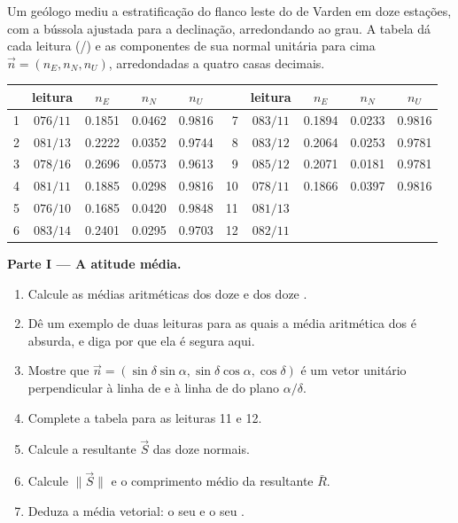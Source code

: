 \begin{problem}
\label{pb:b1:field-lab-methods-1:1}
Um geólogo mediu a estratificação do flanco leste do  de Varden em doze estações, com a bússola ajustada para a declinação, arredondando ao grau. A tabela dá cada leitura (/) e as componentes de sua normal unitária para cima $\vec n = (n_E, n_N, n_U)$, arredondadas a quatro casas decimais.
\begin{center}
\small
\begin{tabular}{rcccc@{\qquad}rcccc}
\hline
 & leitura & $n_E$ & $n_N$ & $n_U$ & & leitura & $n_E$ & $n_N$ & $n_U$ \\
\hline
1 & $076/11$ & 0.1851 & 0.0462 & 0.9816 & 7 & $083/11$ & 0.1894 & 0.0233 & 0.9816 \\
2 & $081/13$ & 0.2222 & 0.0352 & 0.9744 & 8 & $083/12$ & 0.2064 & 0.0253 & 0.9781 \\
3 & $078/16$ & 0.2696 & 0.0573 & 0.9613 & 9 & $085/12$ & 0.2071 & 0.0181 & 0.9781 \\
4 & $081/11$ & 0.1885 & 0.0298 & 0.9816 & 10 & $078/11$ & 0.1866 & 0.0397 & 0.9816 \\
5 & $076/10$ & 0.1685 & 0.0420 & 0.9848 & 11 & $081/13$ & & & \\
6 & $083/14$ & 0.2401 & 0.0295 & 0.9703 & 12 & $082/11$ & & & \\
\hline
\end{tabular}
\end{center}

\medskip
\noindent\textbf{Parte I --- A atitude média.}
\begin{enumerate}
  \item Calcule as médias aritméticas dos doze  e dos doze .
  \item Dê um exemplo de duas leituras para as quais a média aritmética dos  é absurda, e diga por que ela é segura aqui.
  \item Mostre que $\vec n = (\sin\delta\sin\alpha, \sin\delta\cos\alpha,
        \cos\delta)$ é um vetor unitário perpendicular à linha de  e à
        linha de  do plano $\alpha/\delta$.
  \item Complete a tabela para as leituras 11 e 12.
  \item Calcule a resultante $\vec S$ das doze normais.
  \item Calcule $\|\vec S\|$ e o comprimento médio da resultante $\bar R$.
  \item Deduza a média vetorial: o seu  e o seu .
\end{enumerate}


\end{problem}
